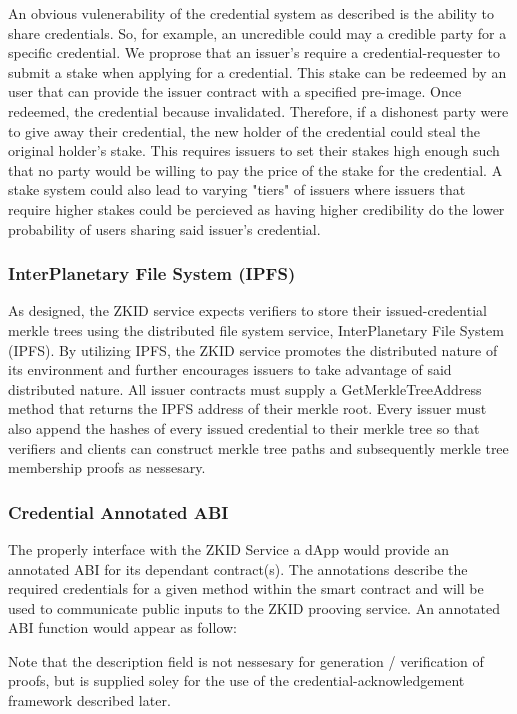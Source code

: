 \documentclass[11 pt]{extarticle}
\theoremstyle{remark}
\begin{document}
An obvious vulenerability of the credential system as described is the ability to share credentials. So, for example, an uncredible could may
a credible party for a specific credential. We proprose that an issuer's require a credential-requester to submit a stake when 
applying for a credential. This stake can be redeemed by an user that can provide the issuer contract with a specified pre-image. Once 
redeemed, the credential because invalidated. Therefore, if a dishonest party were to give away their credential, the new holder of the credential
could steal the original holder's stake. This requires issuers to set their stakes high enough such that no party would be willing to pay the
price of the stake for the credential. A stake system could also lead to varying "tiers" of issuers where issuers that require higher stakes could be 
percieved as having higher credibility do the lower probability of users sharing said issuer's credential.

\subsubsection{InterPlanetary File System (IPFS)}

As designed, the ZKID service expects verifiers to store their issued-credential merkle trees using the distributed file system service, InterPlanetary File System (IPFS).
By utilizing IPFS, the ZKID service promotes the distributed nature of its environment and further encourages issuers to take advantage of said distributed nature. All issuer
contracts must supply a GetMerkleTreeAddress method that returns the IPFS address of their merkle root. Every issuer must also append the hashes of every issued credential 
to their merkle tree so that verifiers and clients can construct merkle tree paths and subsequently merkle tree membership proofs as nessesary. 

\subsubsection{Credential Annotated ABI}
The properly interface with the ZKID Service a dApp would provide an annotated ABI for its dependant contract(s).
The annotations describe the required credentials for a given method within the smart contract and will
be used to communicate public inputs to the ZKID prooving service. An annotated ABI function
would appear as follow:

Note that the description field is not nessesary for generation / verification of proofs, but is supplied soley for
the use of the credential-acknowledgement framework described later. 
\end{document}
